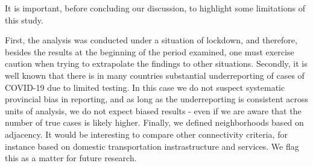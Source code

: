 \documentclass[]{elsarticle} %
\begin{document}
It is important, before concluding our discussion, to highlight some
limitations of this study.

First, the analysis was conducted under a situation of lockdown, and
therefore, besides the results at the beginning of the period examined,
one must exercise caution when trying to extrapolate the findings to
other situations. Secondly, it is well known that there is in many
countries substantial underreporting of cases of COVID-19 due to limited
testing. In this case we do not suspect systematic provincial bias in
reporting, and as long as the underreporting is consistent across units
of analysis, we do not expect biased results - even if we are aware that
the number of true cases is likely higher. Finally, we defined
neighborhoods based on adjacency. It would be interesting to compare
other connectivity criteria, for instance based on domestic
transportation instrastructure and services. We flag this as a matter
for future research.
\end{document}
